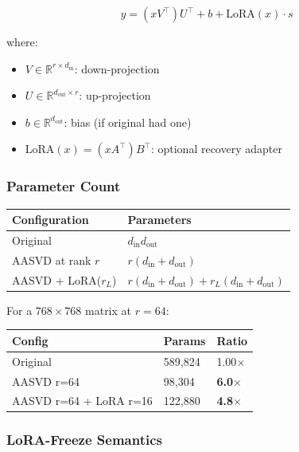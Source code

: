 \[
y = (x V^\top) U^\top + b + \text{LoRA}(x) \cdot s
\tag{4.16}
\]

where:

\begin{itemize}
\item $V \in \mathbb{R}^{r \times d_\text{in}}$: down-projection
\item $U \in \mathbb{R}^{d_\text{out} \times r}$: up-projection
\item $b \in \mathbb{R}^{d_\text{out}}$: bias (if original had one)
\item $\text{LoRA}(x) = (x A^\top) B^\top$: optional recovery adapter

\end{itemize}
\subsubsection{Parameter Count}

\begin{table}[H]
\centering
\small
\begin{tabular}{ll}
\toprule
\textbf{Configuration} & \textbf{Parameters} \\
\midrule
Original & $d_\text{in} d_\text{out}$ \\
AASVD at rank $r$ & $r(d_\text{in} + d_\text{out})$ \\
AASVD + LoRA($r_L$) & $r(d_\text{in} + d_\text{out}) + r_L(d_\text{in} + d_\text{out})$ \\
\bottomrule
\end{tabular}
\end{table}

For a $768 \times 768$ matrix at $r = 64$:

\begin{table}[H]
\centering
\small
\begin{tabular}{lll}
\toprule
\textbf{Config} & \textbf{Params} & \textbf{Ratio} \\
\midrule
Original & 589,824 & 1.00$\times$ \\
AASVD r=64 & 98,304 & \textbf{6.0$\times$} \\
AASVD r=64 + LoRA r=16 & 122,880 & \textbf{4.8$\times$} \\
\bottomrule
\end{tabular}
\end{table}

\subsubsection{LoRA-Freeze Semantics}

